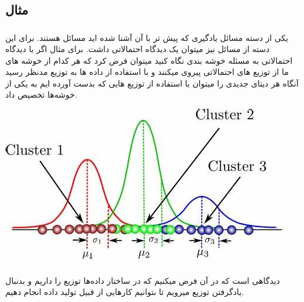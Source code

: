 \documentclass[12pt]{article}
\begin{document}
\fontsize{12pt}{14pt}\selectfont




\section*{}
\subsection*{مثال}
\subsubsection*{}
یکی از دسته مسائل یادگیری که پیش تر با آن آشنا شده اید مسائل
هستند. برای این دسته از مسائل نیز میتوان یک دیدگاه احتمالاتی داشت. برای مثال اگر با دیدگاه احتمالاتی به مسئله خوشه بندی نگاه کنید میتوان فرض کرد که هر کدام از خوشه های ما از توزیع های احتمالاتی پیروی میکنند و با استفاده از داده ها به توزیع مدنظر رسید آنگاه هر دیتای جدیدی را میتوان با استفاده از توزیع هایی که بدست آورده ایم به یکی از خوشه‌ها تخصیص داد.

\includegraphics[width=\textwidth]{figs/GaussianMixtureModel.jpeg}

\subsubsection*{}
دیدگاهی است که در آن فرض میکنیم که در ساختار داده‌ها توزیع 
را داریم و بدنبال یادگرفتن توزیع 
میرویم تا بتوانیم کارهایی از قبیل تولید داده انجام دهیم. 
\href{http://cs231n.stanford.edu/slides/2017/cs231n_2017_lecture13.pdf}{}
\end{document}
